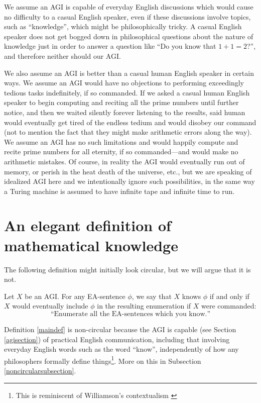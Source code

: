 \documentclass[runningheads]{llncs}
\begin{document}
We assume an AGI is capable of everyday English discussions
which would cause no difficulty to a casual English speaker, even if
these discussions involve topics, such as ``knowledge'', which
might be philosophically tricky. A casual English speaker does not get
bogged down in philosophical questions about the nature of knowledge
just in order to answer a question like ``Do you know that $1+1=2$?'',
and therefore neither should our AGI.

We also assume an AGI is better than a casual human English speaker in certain ways.
We assume an AGI would have no objections to performing exceedingly tedious
tasks indefinitely, if so commanded. If we asked a casual human English speaker to
begin computing and reciting all the prime numbers until further notice, and
then we waited silently forever listening to the results, said human would eventually
get tired of the endless tedium and would disobey our command (not to mention
the fact that they might make arithmetic errors along the way). We assume an AGI
has no such limitations and would happily compute and recite prime numbers for
all eternity, if so commanded---and would make no arithmetic mistakes. Of course,
in reality the AGI would eventually run out of memory, or perish in the heat
death of the universe, etc., but we are speaking of idealized AGI here and we
intentionally ignore such possibilities, in the same way a Turing machine is
assumed to have infinite tape and infinite time to run.


\section{An elegant definition of mathematical knowledge}
\label{mainsection}

The following definition might initially look circular, but we will argue that
it is not.

\begin{definition}
\label{maindef}
  Let $X$ be an AGI.
  For any EA-sentence $\phi$, we say that $X$
  knows $\phi$ if and only
  if $X$ would eventually include $\phi$ in the resulting enumeration
  if $X$ were commanded:
  \[
  \text{``Enumerate all the EA-sentences which you know.''}
  \]
\end{definition}

Definition \ref{maindef} is non-circular because
the AGI is capable (see Section \ref{agisection}) of practical English
communication, including that involving everyday English words such as
the word ``know'', independently of how any philosophers formally
define things\footnote{This is reminiscent of
Williamson's contextualism \cite{williamson2005knowledge}}.
More on this in Subsection \ref{noncircularsubsection}.
\end{document}
